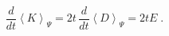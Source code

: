 \begin{equation}
\frac{d}{dt}
\left\langle
K
\right\rangle_{\scriptstyle \!  \Psi}
 =
2t
\, 
\frac{d}{dt}
\left\langle
D
\right\rangle_{\scriptstyle \!  \Psi}
= 2 t  E
\label{eq:D_K_conservation_law_failure}
\;  .
\end{equation}

